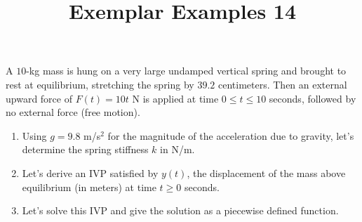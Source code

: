 \documentclass{ximera}
\begin{document}
\begin{abstract}
 \end{abstract}

    \title{Exemplar Examples 14}
    
    \maketitle

A $10$-kg mass is hung on a very large undamped vertical spring and brought to rest at equilibrium, stretching the spring by $39.2$ centimeters.  Then an external upward force of $F(t)=10t$ N is applied at time $0\leq t\leq 10$ seconds, followed by no external force (free motion).


\begin{enumerate}
\item Using $g=9.8$ m/s$^2$ for the magnitude of the acceleration due to gravity, let's determine the spring stiffness $k$ in N/m.


\vfill

\item Let's derive an IVP satisfied by $y(t)$, the displacement of the mass above equilibrium (in meters) at time $t\geq 0$ seconds.

\vfill


\newpage

 \item Let's solve this IVP and give the solution as a piecewise defined function.











\vfill


\end{enumerate}
\end{document}
